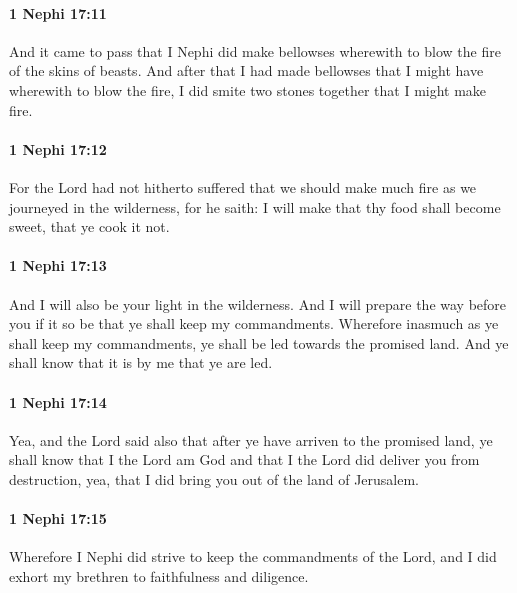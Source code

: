 		\paragraph{1 Nephi 17:11} %
			\label{1NEPHI-17-11}

			And it came to pass that
			I Nephi did make bellowses wherewith to blow the fire
			of the skins of beasts.
			And after that I had made bellowses
			that I might have wherewith to blow the fire,
			I did smite two stones together that I might make fire.

		\paragraph{1 Nephi 17:12} %
			\label{1NEPHI-17-12}

			For the Lord had not hitherto suffered that we should make much fire
			as we journeyed in the wilderness,
			for he saith:
			I will make that thy food shall become sweet,
			that ye cook it not.

		\paragraph{1 Nephi 17:13} %
			\label{1NEPHI-17-13}

			And I will also be your light in the wilderness.
			And I will prepare the way before you
			if it so be that ye shall keep my commandments.
			Wherefore inasmuch as ye shall keep my commandments,
			ye shall be led towards the promised land.
			And ye shall know that it is by me that ye are led.

		\paragraph{1 Nephi 17:14} %
			\label{1NEPHI-17-14}

			Yea, and the Lord said also that
			after ye have arriven to the promised land,
			ye shall know that I the Lord am God
			and that I the Lord did deliver you from destruction,
			yea, that I did bring you out of the land of Jerusalem.

		\paragraph{1 Nephi 17:15} %
			\label{1NEPHI-17-15}

			Wherefore I Nephi did strive to keep the commandments of the Lord,
			and I did exhort my brethren to faithfulness and diligence.

